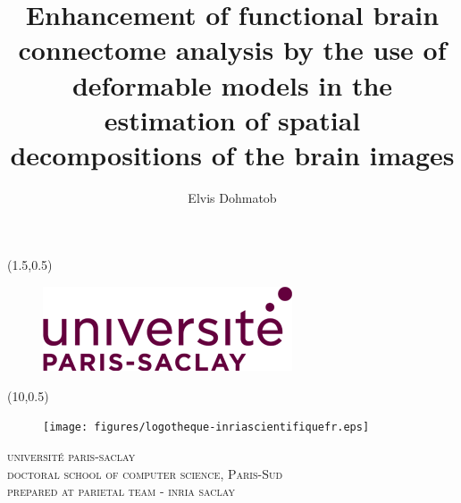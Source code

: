 \documentclass[nobib, a4paper, notoc, twoside, justified, openany]{tufte-book}
\title{Enhancement of functional brain connectome analysis by the use of deformable
models in the estimation of spatial decompositions of the brain images}
\author{Elvis Dohmatob}
\begin{document}

\begin{titlepage}
\begin{fullwidth}
\begin{center}

\begin{textblock}{4}(1.5,0.5)
\begin{figure}
\includegraphics[width=\linewidth]{figures/unips_logo.png}
\end{figure}
\end{textblock}


\begin{textblock}{4.8}(10,0.5)
\begin{figure}
\texttt{[image: figures/logotheque-inriascientifiquefr.eps]}
\end{figure}
\end{textblock}



\vspace*{30pt}
\textsc{{\huge université paris-saclay} \\
{\vspace{10pt} \LARGE doctoral school  of computer science, Paris-Sud}  \\
{\vspace{10pt}\LARGE prepared at parietal team - inria saclay} \\
}

\vspace{10pt}



\end{center}
\end{fullwidth}
\end{titlepage}
\end{document}
